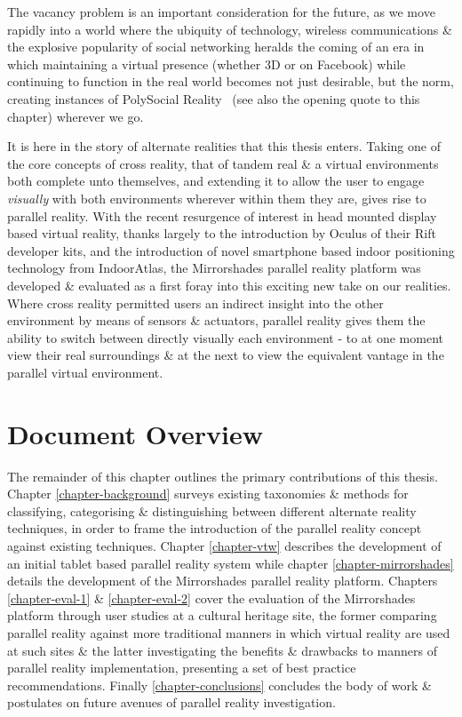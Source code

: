 The vacancy problem is an important consideration for the future, as we move rapidly into a world where the ubiquity of technology, wireless communications \& the explosive popularity of social networking heralds the coming of an era in which maintaining a virtual presence (whether 3D or on Facebook) while continuing to function in the real world becomes not just desirable, but the norm, creating instances of PolySocial Reality~\cite{Applin2012} (see also the opening quote to this chapter) wherever we go.

It is here in the story of alternate realities that this thesis enters. Taking one of the core concepts of cross reality, that of tandem real \& a virtual environments both complete unto themselves, and extending it to allow the user to engage \textit{visually} with both environments wherever within them they are, gives rise to parallel reality. With the recent resurgence of interest in head mounted display based virtual reality, thanks largely to the introduction by Oculus of their Rift developer kits, and the introduction of novel smartphone based indoor positioning technology from IndoorAtlas, the Mirrorshades parallel reality platform was developed \& evaluated as a first foray into this exciting new take on our realities. Where cross reality permitted users an indirect insight into the other environment by means of sensors \& actuators, parallel reality gives them the ability to switch between directly visually each environment - to at one moment view their real surroundings \& at the next to view the equivalent vantage in the parallel virtual environment.


\section{Document Overview}

The remainder of this chapter outlines the primary contributions of this thesis. Chapter \ref{chapter-background} surveys existing taxonomies \& methods for classifying, categorising \& distinguishing between different alternate reality techniques, in order to frame the introduction of the parallel reality concept against existing techniques. Chapter \ref{chapter-vtw} describes the development of an initial tablet based parallel reality system while chapter \ref{chapter-mirrorshades} details the development of the Mirrorshades parallel reality platform. Chapters \ref{chapter-eval-1} \& \ref{chapter-eval-2} cover the evaluation of the Mirrorshades platform through user studies at a cultural heritage site, the former comparing parallel reality against more traditional manners in which virtual reality are used at such sites \& the latter investigating the benefits \& drawbacks to manners of parallel reality implementation, presenting a set of best practice recommendations. Finally \ref{chapter-conclusions} concludes the body of work \& postulates on future avenues of parallel reality investigation.

